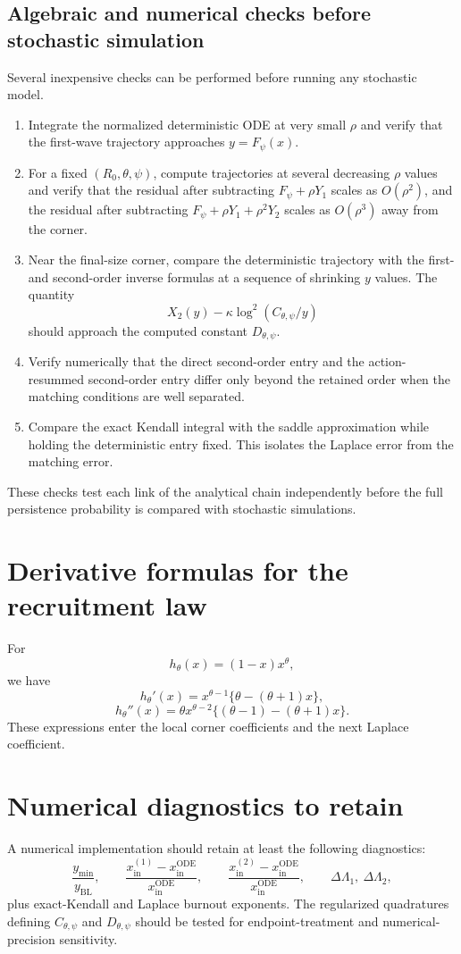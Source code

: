 \documentclass[11pt]{article}
\newcommand{\hth}{h_\theta}
\newcommand{\Cpsi}{C_{\theta,\psi}}
\newcommand{\Dpsi}{D_{\theta,\psi}}
\newcommand{\yin}{y_{\mathrm{BL}}}
\newcommand{\xin}{x_{\mathrm{in}}}
\begin{document}
\subsection{Algebraic and numerical checks before stochastic simulation}
Several inexpensive checks can be performed before running any stochastic model.
\begin{enumerate}
\item Integrate the normalized deterministic ODE at very small \(\rho\) and verify that the first-wave trajectory approaches \(y=F_\psi(x)\).
\item For a fixed \((R_0,\theta,\psi)\), compute trajectories at several decreasing \(\rho\) values and verify that the residual after subtracting \(F_\psi+\rho Y_1\) scales as \(O(\rho^2)\), and the residual after subtracting \(F_\psi+\rho Y_1+\rho^2Y_2\) scales as \(O(\rho^3)\) away from the corner.
\item Near the final-size corner, compare the deterministic trajectory with the first- and second-order inverse formulas at a sequence of shrinking \(y\) values. The quantity
\[
X_2(y)-\kappa\log^2(C_{\theta,\psi}/y)
\]
should approach the computed constant \(D_{\theta,\psi}\).
\item Verify numerically that the direct second-order entry and the action-resummed second-order entry differ only beyond the retained order when the matching conditions are well separated.
\item Compare the exact Kendall integral with the saddle approximation while holding the deterministic entry fixed. This isolates the Laplace error from the matching error.
\end{enumerate}
These checks test each link of the analytical chain independently before the full persistence probability is compared with stochastic simulations.

\appendix
\section{Derivative formulas for the recruitment law}
For
\[
\hth(x)=(1-x)x^\theta,
\]
we have
\[
\hth'(x)=x^{\theta-1}\{\theta-(\theta+1)x\},
\]
\[
\hth''(x)
=\theta x^{\theta-2}\{(\theta-1)-(\theta+1)x\}.
\]
These expressions enter the local corner coefficients and the next Laplace coefficient.

\section{Numerical diagnostics to retain}
A numerical implementation should retain at least the following diagnostics:
\[
\frac{y_{\min}}{\yin},
\qquad
\frac{\xin^{(1)}-\xin^{\mathrm{ODE}}}{\xin^{\mathrm{ODE}}},
\qquad
\frac{\xin^{(2)}-\xin^{\mathrm{ODE}}}{\xin^{\mathrm{ODE}}},
\qquad
\Delta\Lambda_1,\ \Delta\Lambda_2,
\]
plus exact-Kendall and Laplace burnout exponents. The regularized quadratures defining \(\Cpsi\) and \(\Dpsi\) should be tested for endpoint-treatment and numerical-precision sensitivity.
\end{document}

